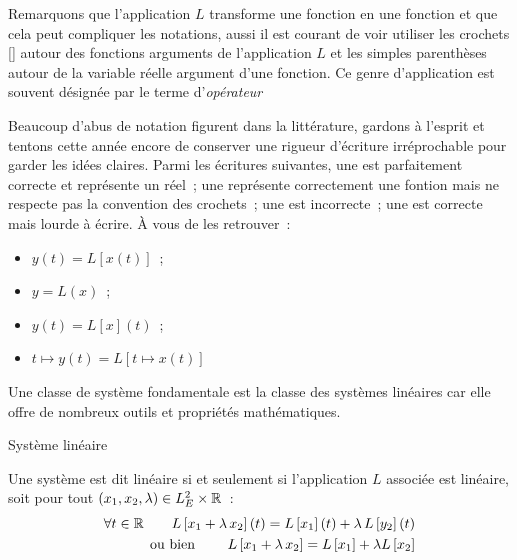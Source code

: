 	\begin{remarque}{}
          Remarquons que l'application $L$ transforme une fonction en
          une fonction et que cela peut compliquer les notations,
          aussi il est courant de voir utiliser les crochets [] autour
          des fonctions arguments de l'application $L$ et les simples
          parenthèses autour de la variable réelle argument d'une
          fonction. Ce genre d'application est souvent désignée par le
          terme d'\emph{opérateur}
	    
          Beaucoup d'abus de notation figurent dans la littérature,
          gardons à l'esprit et tentons cette année encore de
          conserver une rigueur d'écriture irréprochable pour garder
          les idées claires. Parmi les écritures suivantes, une est
          parfaitement correcte et représente un réel~; une représente
          correctement une fontion mais ne respecte pas la convention
          des crochets~; une est incorrecte~; une est correcte mais
          lourde à écrire. À vous de les retrouver~:
          \begin{itemize}
          \item $y(t) = L[x(t)]$~;
          \item $y = L(x)$~;
          \item $y(t) = L[x](t)$~;
          \item $t\mapsto y(t) = L[t\mapsto x(t)]$
          \end{itemize}{}
	\end{remarque}
	
	Une classe de système fondamentale est la classe des systèmes
        linéaires car elle offre de nombreux outils et propriétés
        mathématiques.
	\begin{definition}{Système linéaire}
          \label{def:linearite}
          
          Une système est dit linéaire si et seulement si
          l'application $L$ associée est linéaire, soit pour tout
          $\left(x_1,x_2,\lambda\right) \in L_E^2 \times \mathbb{R}$~:
          \begin{eqnarray}
            \label{eq:def_linearite}
	    \forall t \in \mathbb{R} \qquad L\left[x_1 + \lambda\, x_2\right](t) = L\left[x_1\right](t) + \lambda\,L\left[y_2\right](t) \nonumber\\
	    \text{ou bien } \qquad L\left[x_1 + \lambda\,x_2\right] = L\left[x_1\right] +\lambda L\left[x_2 \right]
          \end{eqnarray}
	\end{definition}
	

